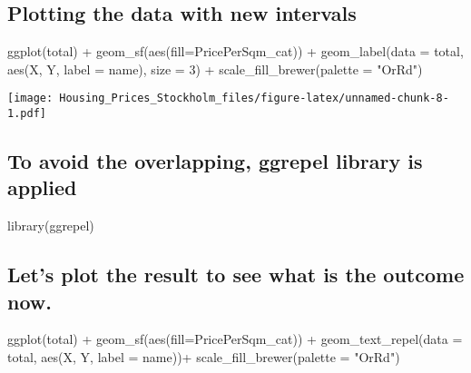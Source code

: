 \documentclass[
]{article}
\newenvironment{Shaded}{\begin{snugshade}}{\end{snugshade}}
\newcommand{\AttributeTok}[1]{\textcolor[rgb]{0.77,0.63,0.00}{#1}}
\newcommand{\DecValTok}[1]{\textcolor[rgb]{0.00,0.00,0.81}{#1}}
\newcommand{\FunctionTok}[1]{\textcolor[rgb]{0.00,0.00,0.00}{#1}}
\newcommand{\NormalTok}[1]{#1}
\newcommand{\SpecialCharTok}[1]{\textcolor[rgb]{0.00,0.00,0.00}{#1}}
\newcommand{\StringTok}[1]{\textcolor[rgb]{0.31,0.60,0.02}{#1}}
\begin{document}
\hypertarget{plotting-the-data-with-new-intervals}{%
\subsection{Plotting the data with new
intervals}\label{plotting-the-data-with-new-intervals}}

\begin{Shaded}
\begin{Highlighting}[]
\FunctionTok{ggplot}\NormalTok{(total) }\SpecialCharTok{+} 
  \FunctionTok{geom\_sf}\NormalTok{(}\FunctionTok{aes}\NormalTok{(}\AttributeTok{fill=}\NormalTok{PricePerSqm\_cat)) }\SpecialCharTok{+}
  \FunctionTok{geom\_label}\NormalTok{(}\AttributeTok{data =}\NormalTok{ total, }\FunctionTok{aes}\NormalTok{(X, Y, }\AttributeTok{label =}\NormalTok{ name), }\AttributeTok{size =} \DecValTok{3}\NormalTok{) }\SpecialCharTok{+}
  \FunctionTok{scale\_fill\_brewer}\NormalTok{(}\AttributeTok{palette =} \StringTok{"OrRd"}\NormalTok{) }
\end{Highlighting}
\end{Shaded}

\texttt{[image: Housing\_Prices\_Stockholm\_files/figure-latex/unnamed-chunk-8-1.pdf]}

\hypertarget{to-avoid-the-overlapping-ggrepel-library-is-applied}{%
\subsection{To avoid the overlapping, ggrepel library is
applied}\label{to-avoid-the-overlapping-ggrepel-library-is-applied}}

\begin{Shaded}
\begin{Highlighting}[]
\FunctionTok{library}\NormalTok{(ggrepel)}
\end{Highlighting}
\end{Shaded}

\hypertarget{lets-plot-the-result-to-see-what-is-the-outcome-now.}{%
\subsection{Let's plot the result to see what is the outcome
now.}\label{lets-plot-the-result-to-see-what-is-the-outcome-now.}}

\begin{Shaded}
\begin{Highlighting}[]
\FunctionTok{ggplot}\NormalTok{(total) }\SpecialCharTok{+} 
  \FunctionTok{geom\_sf}\NormalTok{(}\FunctionTok{aes}\NormalTok{(}\AttributeTok{fill=}\NormalTok{PricePerSqm\_cat)) }\SpecialCharTok{+}
  \FunctionTok{geom\_text\_repel}\NormalTok{(}\AttributeTok{data =}\NormalTok{ total, }\FunctionTok{aes}\NormalTok{(X, Y, }\AttributeTok{label =}\NormalTok{ name))}\SpecialCharTok{+}
  \FunctionTok{scale\_fill\_brewer}\NormalTok{(}\AttributeTok{palette =} \StringTok{"OrRd"}\NormalTok{) }
\end{Highlighting}
\end{Shaded}
\end{document}
